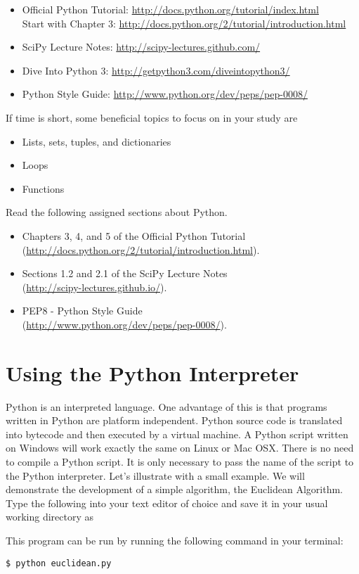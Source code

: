 \begin{itemize}
\item Official Python Tutorial: \url{http://docs.python.org/tutorial/index.html} \\
      Start with Chapter 3: \url{http://docs.python.org/2/tutorial/introduction.html}
\item SciPy Lecture Notes: \url{http://scipy-lectures.github.com/}
\item Dive Into Python 3: \url{http://getpython3.com/diveintopython3/}
\item Python Style Guide: \url{http://www.python.org/dev/peps/pep-0008/}
\end{itemize}
If time is short, some beneficial topics to focus on in your study are
\begin{itemize}
\item Lists, sets, tuples, and dictionaries
\item Loops
\item Functions
\end{itemize}

\begin{problem}
Read the following assigned sections about Python.
\begin{itemize}
\item Chapters 3, 4, and 5 of the Official Python Tutorial \\
        (\url{http://docs.python.org/2/tutorial/introduction.html}).
\item Sections 1.2 and 2.1 of the SciPy Lecture Notes \\
        (\url{http://scipy-lectures.github.io/}).
\item PEP8 - Python Style Guide \\
        (\url{http://www.python.org/dev/peps/pep-0008/}).
\end{itemize}
\end{problem}

\section*{Using the Python Interpreter}
Python is an interpreted language.
One advantage of this is that programs written in Python are platform independent.
Python source code is translated into bytecode and then executed by a virtual machine.
A Python script written on Windows will work exactly the same on Linux or Mac OSX.
There is no need to compile a Python script.
It is only necessary to pass the name of the script to the Python interpreter.
Let's illustrate with a small example.
We will demonstrate the development of a simple algorithm, the Euclidean Algorithm.
Type the following into your text editor of choice and save it in your usual working directory as 

This program can be run by running the following command in your terminal:
\begin{lstlisting}
$ python euclidean.py
\end{lstlisting}

